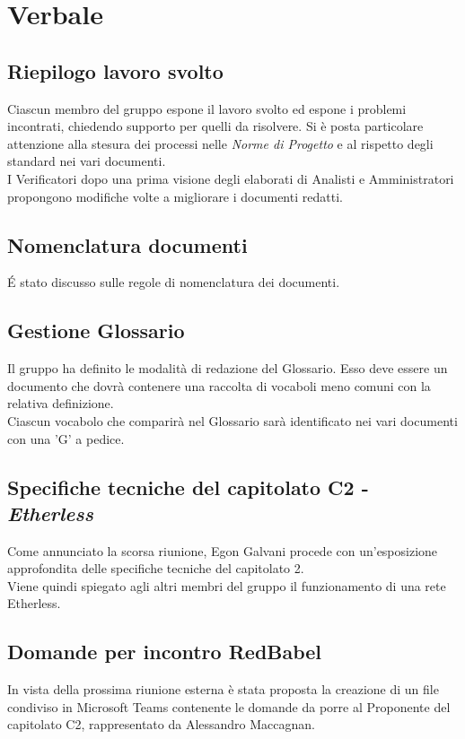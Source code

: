 \section{Verbale}
	
	\subsection{Riepilogo lavoro svolto}
		Ciascun membro del gruppo espone il lavoro svolto ed espone i problemi incontrati, chiedendo supporto per quelli da risolvere. Si è posta particolare attenzione alla stesura dei processi nelle \textit{Norme di Progetto} e al rispetto degli standard nei vari documenti.\\
		I Verificatori dopo una prima visione degli elaborati di Analisti e Amministratori propongono modifiche volte a migliorare i documenti redatti.
		
		
	\subsection{Nomenclatura documenti}
		\'E stato discusso sulle regole di nomenclatura dei documenti.
		
		
	\subsection{Gestione Glossario}
		Il gruppo ha definito le modalità di redazione del Glossario. Esso deve essere un documento che dovrà contenere una raccolta di vocaboli meno comuni con la relativa definizione.\\
		Ciascun vocabolo che comparirà nel Glossario sarà identificato nei vari documenti con una ’G’ a pedice.


	\subsection{Specifiche tecniche del capitolato C2 - \textit{Etherless}}
		Come annunciato la scorsa riunione, Egon Galvani procede con un'esposizione approfondita delle specifiche tecniche del capitolato 2.\\
		Viene quindi spiegato agli altri membri del gruppo il funzionamento di una rete Etherless.
		
	
	\subsection{Domande per incontro RedBabel}
		In vista della prossima riunione esterna è stata proposta la creazione di un file condiviso in Microsoft Teams contenente le domande da porre al Proponente del capitolato C2, rappresentato da Alessandro Maccagnan.


